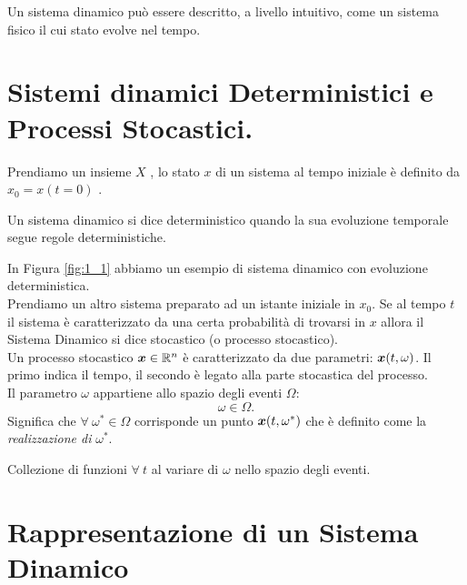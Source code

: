 Un sistema dinamico può essere descritto, a livello intuitivo, come un sistema fisico il cui stato evolve nel tempo.
\section{Sistemi dinamici Deterministici e Processi Stocastici.}%
\label{sub:Sistema dinamico Deterministico e Stocastico.}
Prendiamo un insieme $X$ 
, lo stato $x$ di un sistema al tempo iniziale è definito da $x_0 = x(t=0)$
\leavevmode{}.
\begin{defn}
    Un sistema dinamico si dice deterministico quando la sua evoluzione temporale segue regole deterministiche.
\end{defn}
\noindent
In Figura \ref{fig:1_1} abbiamo un esempio di sistema dinamico con evoluzione deterministica.\\
Prendiamo un altro sistema preparato ad un istante iniziale in $x_0$. Se al tempo $t$ il sistema è caratterizzato da una certa probabilità di trovarsi in $x$ 
allora il Sistema Dinamico si dice stocastico (o processo stocastico).\\
Un processo stocastico $\boldsymbol{x} \in \mathbb{R}^n$ è caratterizzato da due parametri: $\boldsymbol{x} (t, \omega)$. Il primo indica il tempo, il secondo è legato alla parte stocastica del processo. \\
Il parametro $\omega$ appartiene allo spazio degli eventi $\Omega$:
\[
    \omega  \in \Omega
.\] 
Significa che $ \forall \ \omega^* \in \Omega$ corrisponde un punto $\boldsymbol{x} (t, \omega^*)$ che è definito come la \textit{realizzazione di }$\omega^*$.
\begin{defn}
    Collezione di funzioni $\forall \ t$ al variare di $\omega$ nello spazio degli eventi.
\end{defn}
\noindent
\section{Rappresentazione di un Sistema Dinamico}%
\label{sub:Rappresentazione di un Sistema Dinamico}
